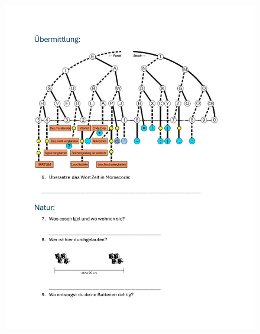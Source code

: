 \begin{figure}[!h]
\begin{minipage}[t]{0.49\textwidth}
        \includegraphics[width=\textwidth]{Picture/seite2.pdf}
    \end{minipage}
    
    \vspace{0.05\textwidth}
    

\end{figure}
